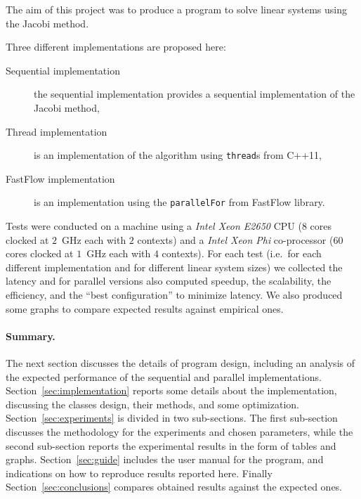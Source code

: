 The aim of this project was to produce a program to solve linear systems using the Jacobi method.

Three different implementations are proposed here:
\begin{description}
    \item[Sequential implementation] the sequential implementation provides a sequential implementation of the Jacobi method,
    \item[Thread implementation] is an implementation of the algorithm using \lstinline+thread+s from C++11,  
    \item[FastFlow implementation] is an implementation using the \lstinline+parallelFor+ from FastFlow library.
\end{description}

Tests were conducted on a machine using a \emph{Intel Xeon E2650} CPU ($8$ cores clocked at $2$~\si{\giga\hertz} each with $2$ contexts) and a \emph{Intel Xeon Phi} co-processor ($60$ cores clocked at $1$~\si{\giga\hertz} each with $4$ contexts).
For each test (i.e.\ for each different implementation and for different linear system sizes) we collected the latency and for parallel versions also computed speedup, the scalability, the efficiency, and the ``best configuration'' to minimize latency.
We also produced some graphs to compare expected results against empirical ones.

\paragraph{Summary.} The next section discusses the details of program design, including an analysis of the expected performance of the sequential and parallel implementations.
Section~\ref{sec:implementation} reports some details about the implementation, discussing the classes design, their methods, and some optimization.
\alert{Section~\ref{sec:experiments} is divided in two sub-sections. 
The first sub-section discusses the methodology for the experiments and chosen parameters, while the second sub-section reports the experimental results in the form of tables and graphs.
Section~\ref{sec:guide} includes the user manual for the program, and indications on how to reproduce results reported here.
Finally Section~\ref{sec:conclusions} compares obtained results against the expected ones.}